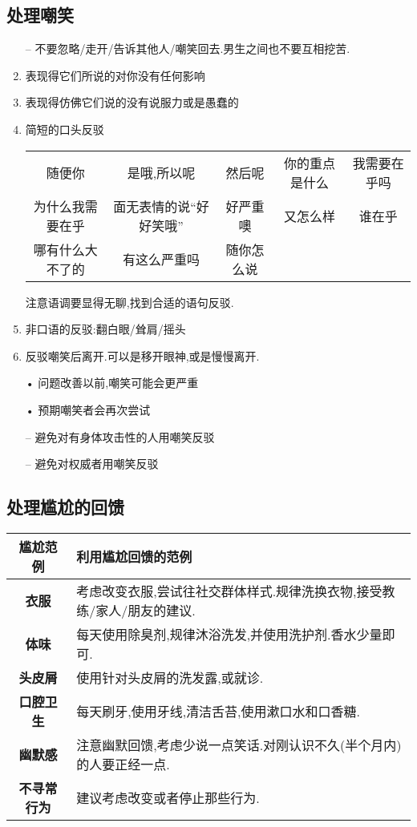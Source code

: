 \documentclass[UTF8]{article}
\newcommand{\Dot}{•}
\newcommand{\dash}{–}
\begin{document}
\subsection{处理嘲笑}
\begin{enumerate}
    \item[\dash] 不要忽略/走开/告诉其他人/嘲笑回去.男生之间也不要互相挖苦.
    \item 表现得它们所说的对你没有任何影响
    \item 表现得仿佛它们说的没有说服力或是愚蠢的
    \item 简短的口头反驳\begin{center}
        \begin{tabular}{|ccccc|}\hline
            随便你&是哦,所以呢&然后呢&你的重点是什么&我需要在乎吗\\ 
            为什么我需要在乎&面无表情的说``好好笑哦''&好严重噢&又怎么样&谁在乎\\
            哪有什么大不了的&有这么严重吗&随你怎么说&&\\\hline
        \end{tabular}
    \end{center}注意语调要显得无聊,找到合适的语句反驳.
    \item 非口语的反驳:翻白眼/耸肩/摇头
    \item 反驳嘲笑后离开.可以是移开眼神,或是慢慢离开.
    \item[\Dot] 问题改善以前,嘲笑可能会更严重
    \item[\Dot] 预期嘲笑者会再次尝试
    \item[\dash] 避免对有身体攻击性的人用嘲笑反驳
    \item[\dash] 避免对权威者用嘲笑反驳
\end{enumerate}

\subsection{处理尴尬的回馈}
\begin{center}
\begin{tabular}{c|l}
\textbf{尴尬范例}&\textbf{利用尴尬回馈的范例}\\\hline
\textbf{衣服}&考虑改变衣服,尝试往社交群体样式.规律洗换衣物,接受教练/家人/朋友的建议.\\
\textbf{体味}&每天使用除臭剂,规律沐浴洗发,并使用洗护剂.香水少量即可.\\
\textbf{头皮屑}&使用针对头皮屑的洗发露,或就诊.\\
\textbf{口腔卫生}&每天刷牙,使用牙线,清洁舌苔,使用漱口水和口香糖.\\
\textbf{幽默感}&注意幽默回馈,考虑少说一点笑话.对刚认识不久(半个月内)的人要正经一点.\\
\textbf{不寻常行为}&建议考虑改变或者停止那些行为.\\
\end{tabular}
\end{center}
\end{document}
